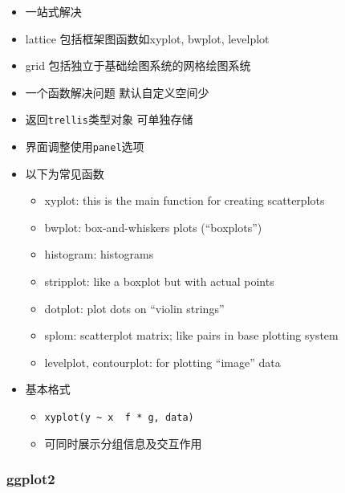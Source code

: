 \documentclass[]{book}
\providecommand{\tightlist}{%
  \setlength{\itemsep}{0pt}\setlength{\parskip}{0pt}}
\begin{document}
\begin{itemize}
\tightlist
\item
  一站式解决
\item
  lattice 包括框架图函数如xyplot, bwplot, levelplot
\item
  grid 包括独立于基础绘图系统的网格绘图系统
\item
  一个函数解决问题 默认自定义空间少
\item
  返回\texttt{trellis}类型对象 可单独存储
\item
  界面调整使用\texttt{panel}选项
\item
  以下为常见函数

  \begin{itemize}
  \tightlist
  \item
    xyplot: this is the main function for creating scatterplots
  \item
    bwplot: box-and-whiskers plots (``boxplots'')
  \item
    histogram: histograms
  \item
    stripplot: like a boxplot but with actual points
  \item
    dotplot: plot dots on ``violin strings''
  \item
    splom: scatterplot matrix; like pairs in base plotting system
  \item
    levelplot, contourplot: for plotting ``image'' data
  \end{itemize}
\item
  基本格式

  \begin{itemize}
  \tightlist
  \item
    \texttt{xyplot(y\ \textasciitilde{}\ x\ \textbar{}\ f\ *\ g,\ data)}
  \item
    可同时展示分组信息及交互作用
  \end{itemize}
\end{itemize}

\hypertarget{ggplot2}{%
\subsubsection{ggplot2}\label{ggplot2}}
\end{document}
